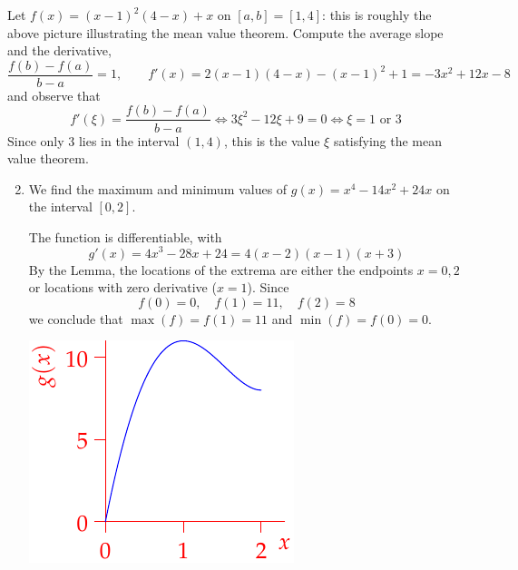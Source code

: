 \begin{examples}{}{}
	\exstart Let $f(x)=(x-1)^2(4-x)+x$ on $[a,b]=[1,4]$: this is roughly the above picture illustrating the mean value theorem. Compute the average slope and the derivative,
	\[
		\frac{f(b)-f(a)}{b-a}=1,\qquad 
		f'(x)=2(x-1)(4-x)-(x-1)^2+1 =-3x^2+12x-8
	\]
	and observe that
	\[
		f'(\xi)=\frac{f(b)-f(a)}{b-a}\iff 3\xi^2-12\xi+9=0\iff \xi=1\text{ or }3
	\]
	Since only 3 lies in the interval $(1,4)$, this is the value $\xi$ satisfying the mean value theorem.
	\begin{enumerate}\setcounter{enumi}{1}
	  \item We find the maximum and minimum values of $g(x)=x^4-14x^2+24x$ on the interval $[0,2]$.\vspace{-8pt}
	  
	  \begin{minipage}[t]{0.68\linewidth}\vspace{0pt}
	  The function is differentiable, with
	  \[
	  	g'(x)=4x^3-28x+24=4(x-2)(x-1)(x+3)
	  \]
	  By the Lemma, the locations of the extrema are either the endpoints $x=0,2$ or locations with zero derivative ($x=1$). Since
	  \[
	  	f(0)=0,\quad f(1)=11,\quad f(2)=8
	  \]
	  we conclude that $\max(f)=f(1)=11$ and $\min(f)=f(0)=0$.
	  \end{minipage}
	  \hfill
	  \begin{minipage}[t]{0.31\linewidth}\vspace{0pt}
	  	\flushright\includegraphics[scale=0.95]{mvt-ex}
	  \end{minipage}
	\end{enumerate}
\end{examples}


